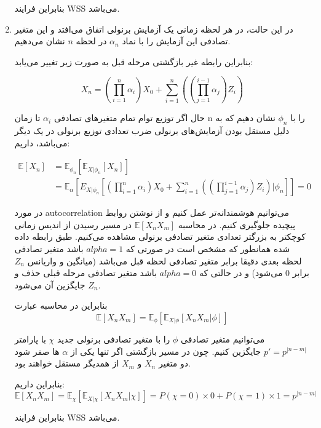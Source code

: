 \begin{enumerate}
	بنابراین فرایند WSS می‌باشد.
	
	\item
	
	در این حالت، در هر لحظه زمانی یک آزمایش برنولی اتفاق می‌افتد و این متغیر تصادفی این آزمایش را با نماد
	$\alpha_n$
	در لحظه $n$ نشان می‌دهیم.
	
	بنابراین رابطه غیر بازگشتی مرحله قبل به صورت زیر تغییر می‌یابد:
	
	$$
	{X_n} = \left( {\prod\limits_{i = 1}^n {{\alpha _i}} } \right){X_0} + \sum\limits_{i = 1}^n {\left( {\left( {\prod\limits_{j = 1}^{i - 1} {{\alpha _j}} } \right){Z_i}} \right)}
	$$
	
	حال اگر توزیع توام تمام متغیر‌های تصادفی
	$\alpha_i$
	تا زمان n را با
	${\phi _n}$
	نشان دهیم که به دلیل مستقل بودن آزمایش‌های برنولی ضرب تعدادی توزیع برنولی در یک دیگر می‌باشد،‌ داریم:
	
	$$
	\begin{aligned}
		\mathbb{E}\left[ {{X_n}} \right] & = {\mathbb{E}_{{\phi _n}}}\left[ {{\mathbb{E}_{X|{\phi _n}}}\left[ {{X_n}} \right]} \right]\\
		& = {\mathbb{E}_\alpha }\left[ {{E_{X|{\phi _n}}}\left[ {\left( {\prod\limits_{i = 1}^n {{\alpha _i}} } \right){X_0} + \sum\limits_{i = 1}^n {\left( {\left( {\prod\limits_{j = 1}^{i - 1} {{\alpha _j}} } \right){Z_i}} \right)} |{\phi _n}} \right]} \right] = 0
	\end{aligned}
	$$
	
	در مورد autocorrelation می‌توانیم هوشمندانه‌تر عمل کنیم و از نوشتن روابط پیچیده جلوگیری کنیم. در محاسبه
	$\mathbb{E}\left[ {{X_n}{X_m}} \right]$
	در مسیر رسیدن از اندیس زمانی کوچکتر به بزرگتر تعدادی متغیر تصادفی برنولی مشاهده می‌کنیم. طبق رابطه داده شده همانطور که مشخص است در صورتی که
	$alpha=1$
	باشد متغیر تصادفی لحظه بعدی دقیقا برابر متغیر تصادفی لحظه قبل می‌باشد (میانگین و واریانس
	${Z_n}$
	 برابر 0 می‌شود) و در حالتی که
	 $alpha=0$
	 باشد متغیر تصادفی مرحله قبلی حذف و
	 ${Z_n}$
	 جایگزین آن می‌شود.
	 
	 بنابراین در محاسبه عبارت
	 $$
	 \mathbb{E}\left[ {{X_n}{X_m}} \right] = {\mathbb{E}_\phi }\left[ {{\mathbb{E}_{X|\phi }}\left[ {{X_n}{X_m}|\phi } \right]} \right]
	 $$
	 
	 می‌توانیم متغیر تصادفی
	 $\phi$
	 را با متغیر تصادفی برنولی جدید
	 $\chi$
	 با پارامتر
	 $p' = {p^{\left| {n - m} \right|}}$
	 جایگزین کنیم. چون در مسیر بازگشتی اگر تنها یکی از
	 $\alpha$
	 ها صفر شود دو متغیر
	 $X_n$
	 و
	 $X_m$
	 از همدیگر مستقل خواهند بود.
	 
	 بنابراین داریم:
	 $$
	 \mathbb{E}\left[ {{X_n}{X_m}} \right] = {\mathbb{E}_\chi }\left[ {{\mathbb{E}_{X|\chi }}\left[ {{X_n}{X_m}|\chi } \right]} \right] = P\left( {\chi  = 0} \right) \times 0 + P\left( {\chi  = 1} \right) \times 1 = {p^{\left| {n - m} \right|}}
	 $$
	 
	بنابراین فرایند WSS می‌باشد.
	
\end{enumerate}